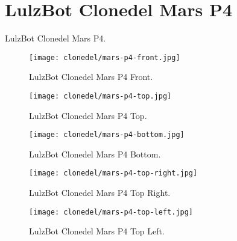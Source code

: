 %
%
%
%
%

\section{LulzBot Clonedel Mars P4}
LulzBot Clonedel Mars P4.

\begin{figure}[h!]
\texttt{[image: clonedel/mars-p4-front.jpg]}
 \caption{LulzBot Clonedel Mars P4 Front.}
 \label{fig:clonedel-mars-p4-front}
\end{figure}

\begin{figure}[h!]
\texttt{[image: clonedel/mars-p4-top.jpg]}
 \caption{LulzBot Clonedel Mars P4 Top.}
 \label{fig:clonedel-mars-p4-top}
\end{figure}

\begin{figure}[h!]
\texttt{[image: clonedel/mars-p4-bottom.jpg]}
 \caption{LulzBot Clonedel Mars P4 Bottom.}
 \label{fig:clonedel-mars-p4-bottom}
\end{figure}

\begin{figure}[h!]
\texttt{[image: clonedel/mars-p4-top-right.jpg]}
 \caption{LulzBot Clonedel Mars P4 Top Right.}
 \label{fig:clonedel-mars-p4-top-right}
\end{figure}

\begin{figure}[h!]
\texttt{[image: clonedel/mars-p4-top-left.jpg]}
 \caption{LulzBot Clonedel Mars P4 Top Left.}
 \label{fig:clonedel-mars-p4-top-left}
\end{figure}

